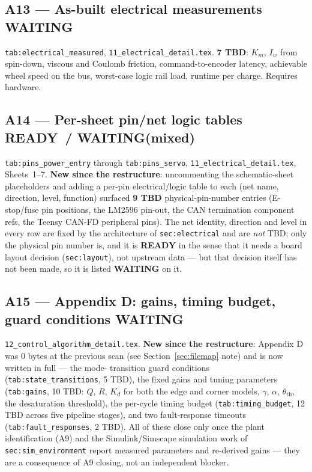 \documentclass[11pt,a4paper]{article}
\newcommand{\ready}{\textcolor{readycol}{\textbf{READY}}}
\newcommand{\waiting}{\textcolor{waitcol}{\textbf{WAITING}}}
\begin{document}
\subsection{A13 --- As-built electrical measurements \quad \waiting}

\texttt{tab:electrical\_measured}, \texttt{11\_electrical\_detail.tex}.
\textbf{7 TBD}: $K_m$, $I_w$ from spin-down, viscous and Coulomb friction,
command-to-encoder latency, achievable wheel speed on the bus, worst-case
logic rail load, runtime per charge. Requires hardware.

\subsection{A14 --- Per-sheet pin/net logic tables \quad \ready\ / \waiting (mixed)}

\texttt{tab:pins\_power\_entry} through \texttt{tab:pins\_servo},
\texttt{11\_electrical\_detail.tex}, Sheets~1--7. \textbf{New since the
restructure}: uncommenting the schematic-sheet placeholders and adding a
per-pin electrical/logic table to each (net name, direction, level, function)
surfaced \textbf{9 TBD} physical-pin-number entries (E-stop/fuse pin
positions, the LM2596 pin-out, the CAN termination component refs, the Teensy
CAN-FD peripheral pins). The net identity, direction and level in every row
are fixed by the architecture of \texttt{sec:electrical} and are \emph{not}
TBD; only the physical pin number is, and it is \ready{} in the sense that it
needs a board layout decision (\texttt{sec:layout}), not upstream data --- but
that decision itself has not been made, so it is listed \waiting{} on it.

\subsection{A15 --- Appendix D: gains, timing budget, guard conditions \quad \waiting}

\texttt{12\_control\_algorithm\_detail.tex}. \textbf{New since the
restructure}: Appendix D was 0 bytes at the previous scan (see
Section~\ref{sec:filemap} note) and is now written in full --- the mode-
transition guard conditions (\texttt{tab:state\_transitions}, 5 TBD), the
fixed gains and tuning parameters (\texttt{tab:gains}, 10 TBD: $Q$, $R$,
$K_d$ for both the edge and corner models, $\gamma$, $\alpha$,
$\theta_{\text{th}}$, the desaturation threshold), the per-cycle timing budget
(\texttt{tab:timing\_budget}, 12 TBD across five pipeline stages), and two
fault-response timeouts (\texttt{tab:fault\_responses}, 2 TBD). All of these
close only once the plant identification (A9) and the Simulink/Simscape
simulation work of \texttt{sec:sim\_environment} report measured parameters
and re-derived gains --- they are a consequence of A9 closing, not an
independent blocker.
\end{document}
